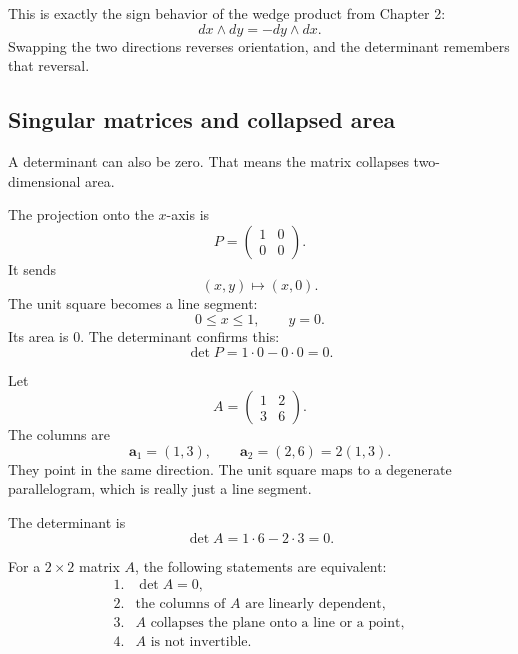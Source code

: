 This is exactly the sign behavior of the wedge product from Chapter 2:
\[
    dx\wedge dy=-dy\wedge dx.
\]
Swapping the two directions reverses orientation, and the determinant remembers that
reversal.

\subsection{Singular matrices and collapsed area}

A determinant can also be zero.  That means the matrix collapses two-dimensional area.

\begin{example}
The projection onto the \(x\)-axis is
\[
    P=
    \begin{pmatrix}
        1&0\\
        0&0
    \end{pmatrix}.
\]
It sends
\[
    (x,y)\longmapsto (x,0).
\]
The unit square becomes a line segment:
\[
    0\le x\le1,\qquad y=0.
\]
Its area is \(0\).  The determinant confirms this:
\[
    \det P=1\cdot0-0\cdot0=0.
\]
\end{example}

\begin{example}
Let
\[
    A=
    \begin{pmatrix}
        1&2\\
        3&6
    \end{pmatrix}.
\]
The columns are
\[
    \mathbf a_1=(1,3),
    \qquad
    \mathbf a_2=(2,6)=2(1,3).
\]
They point in the same direction.  The unit square maps to a degenerate parallelogram,
which is really just a line segment.

The determinant is
\[
    \det A=1\cdot6-2\cdot3=0.
\]
\end{example}

\begin{theorem}
For a \(2\times2\) matrix \(A\), the following statements are equivalent:
\[
\begin{array}{ll}
1. & \det A=0,\\
2. & \text{the columns of }A\text{ are linearly dependent},\\
3. & A\text{ collapses the plane onto a line or a point},\\
4. & A\text{ is not invertible}.
\end{array}
\]
\end{theorem}

